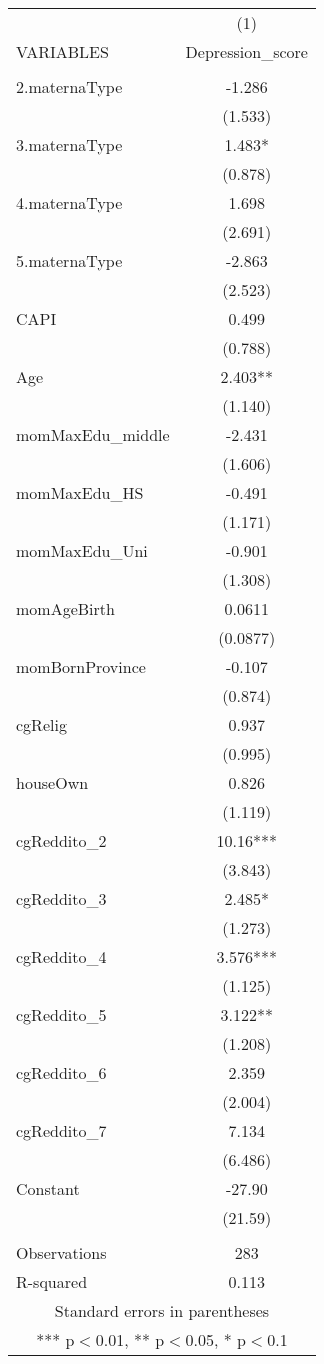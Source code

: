 \begin{tabular}{lc} \hline
 & (1) \\
VARIABLES & Depression\_score \\ \hline
 &  \\
2.maternaType & -1.286 \\
 & (1.533) \\
3.maternaType & 1.483* \\
 & (0.878) \\
4.maternaType & 1.698 \\
 & (2.691) \\
5.maternaType & -2.863 \\
 & (2.523) \\
CAPI & 0.499 \\
 & (0.788) \\
Age & 2.403** \\
 & (1.140) \\
momMaxEdu\_middle & -2.431 \\
 & (1.606) \\
momMaxEdu\_HS & -0.491 \\
 & (1.171) \\
momMaxEdu\_Uni & -0.901 \\
 & (1.308) \\
momAgeBirth & 0.0611 \\
 & (0.0877) \\
momBornProvince & -0.107 \\
 & (0.874) \\
cgRelig & 0.937 \\
 & (0.995) \\
houseOwn & 0.826 \\
 & (1.119) \\
cgReddito\_2 & 10.16*** \\
 & (3.843) \\
cgReddito\_3 & 2.485* \\
 & (1.273) \\
cgReddito\_4 & 3.576*** \\
 & (1.125) \\
cgReddito\_5 & 3.122** \\
 & (1.208) \\
cgReddito\_6 & 2.359 \\
 & (2.004) \\
cgReddito\_7 & 7.134 \\
 & (6.486) \\
Constant & -27.90 \\
 & (21.59) \\
 &  \\
Observations & 283 \\
 R-squared & 0.113 \\ \hline
\multicolumn{2}{c}{ Standard errors in parentheses} \\
\multicolumn{2}{c}{ *** p$<$0.01, ** p$<$0.05, * p$<$0.1} \\
\end{tabular}
